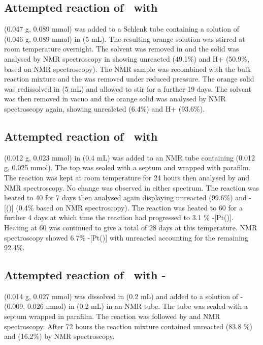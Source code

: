 \subsection*{Attempted reaction of \tButhixantphos\ with \ce{[Pt(hex)I2]}}
\ce{[Pt(hex)I2]} (0.047 g, 0.089 mmol) was added to a Schlenk tube containing a solution of \tButhixantphos{} (0.046 g, 0.089 mmol) in  (5 mL).  The resulting orange solution was stirred at room temperature overnight.  The solvent was removed in  and the solid was analysed by NMR spectroscopy in  showing unreacted \tButhixantphos{} (49.1\%) and \tButhixantphos H+ (50.9\%, based on \phosphorus{} NMR spectroscopy).  The NMR sample was recombined with the bulk reaction mixture and the  was removed under reduced pressure.  The orange solid was redissolved in  (5 mL) and allowed to stir for a further 19 days.  The solvent was then removed in vacuo and the orange solid was analysed by NMR spectroscopy again, showing unrealcted \tButhixantphos{} (6.4\%) and \tButhixantphos H+ (93.6\%).  

\subsection*{Attempted reaction of \tButhixantphos\ with }
\tButhixantphos{} (0.012 g, 0.023 mmol) in  (0.4 mL) was added to an NMR tube containing  (0.012 g, 0.025 mmol).  The top was sealed with a septum and wrapped with parafilm.  The reaction was kept at room temperature for 24 hours then analysed by \proton{} and \phosphorus{} NMR spectroscopy.  No change was observed in either spectrum.  The reaction was heated to 40 \degC{} for 7 days then analysed again displaying unreacted \tButhixantphos{} (99.6\%) and \trans-[(\tButhixantphos)] (0.4\% based on \phosphorus{} NMR spectroscopy).  The reaction was heated to 60 \degC{} for a further 4 days at which time the reaction had progressed to 3.1 \% \trans-[Pt(\tButhixantphos)].  Heating at 60 \degC{} was continued to give a total of 28 days at this temperature.  NMR spectroscopy showed 6.7\% \trans-[Pt(\tButhixantphos)] with unreacted \tButhixantphos{} accounting for the remaining 92.4\%.

\subsection*{Attempted reaction of \tButhixantphos\ with \cis-}
\tButhixantphos{} (0.014 g, 0.027 mmol) was dissolved in  (0.2 mL) and added to a solution of \cis- (0.009, 0.026 mmol) in  (0.2 mL) in an NMR tube.  The tube was sealed with a septum wrapped in parafilm.  The reaction was followed by \proton{} and \phosphorus{} NMR spectroscopy.  After 72 hours the reaction mixture contained unreacted \tButhixantphos{} (83.8 \%) and \tButhixantphos{}  (16.2\%) by \phosphorus{} NMR spectroscopy.  

